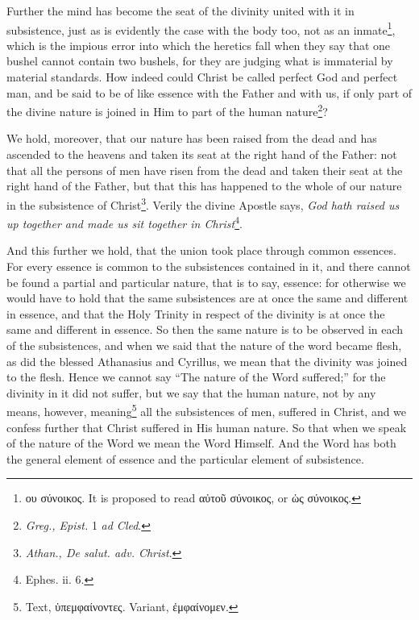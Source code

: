 Further the mind has become the seat of the divinity united with it in subsistence, just as is evidently the case with the body too, not as an inmate\footnote{\textgreek{ου σύνοικος}. It is proposed to read \textgreek{αὐτοῦ σύνοικος}, or \textgreek{ὡς σύνοικος}.}, which is the impious error into which the heretics fall when they say that one bushel cannot contain two bushels, for they are judging what is immaterial by material standards. How indeed could Christ be called perfect God and perfect man, and be said to be of like essence with the Father and with us, if only part of the divine nature is joined in Him to part of the human nature\footnote{\emph{Greg., Epist.} 1 \emph{ad Cled}.}?

We hold, moreover, that our nature has been raised from the dead and has ascended to the heavens and taken its seat at the right hand of the Father: not that all the persons of men have risen from the dead and taken their seat at the right hand of the Father, but that this has happened to the whole of our nature in the subsistence of Christ\footnote{\emph{Athan., De salut. adv. Christ}.}. Verily the divine Apostle says, \emph{God hath raised us up together and made us sit together in Christ}\footnote{Ephes. ii. 6.}.

And this further we hold, that the union took place through common essences. For every essence is common to the subsistences contained in it, and there cannot be found a partial and particular nature, that is to say, essence: for otherwise we would have to hold that the same subsistences are at once the same and different in essence, and that the Holy Trinity in respect of the divinity is at once the same and different in essence. So then the same nature is to be observed in each of the subsistences, and when we said that the nature of the word became flesh, as did the blessed Athanasius and Cyrillus, we mean that the divinity was joined to the flesh. Hence we cannot say “The nature of the Word suffered;” for the divinity in it did not suffer, but we say that the human nature, not by any means, however, meaning\footnote{Text, \textgreek{ὑπεμφαίνοντες}. Variant, \textgreek{ἐμφαίνομεν}.} all the subsistences of men, suffered in Christ, and we confess further that Christ suffered in His human nature. So that when we speak of the nature of the Word we mean the Word Himself. And the Word has both the general element of essence and the particular element of subsistence.


